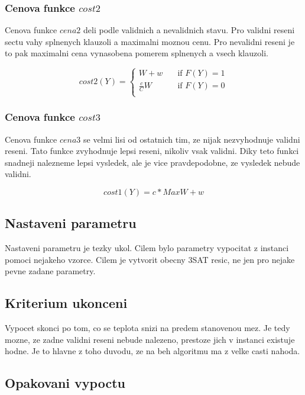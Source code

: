 \documentclass[12pt,a4paper]{article}
\begin{document}
\subsubsection{Cenova funkce $cost2$}

Cenova funkce $cena2$ deli podle validnich a nevalidnich stavu. Pro validni reseni sectu vahy splnenych klauzoli a maximalni moznou cenu. Pro nevalidni reseni je to pak maximalni cena vynasobena pomerem splnenych a vsech klauzoli.

$$
 cost2(Y) =
  \begin{cases}
    W + w       & \quad \text{if } F(Y) = 1 \\
    \frac{c}{C}W  & \quad \text{if } F(Y) = 0 \\
  \end{cases}
$$

\subsubsection{Cenova funkce $cost3$}

Cenova funkce $cena3$ se velmi lisi od ostatnich tim, ze nijak nezvyhodnuje validni reseni.  Tato funkce zvyhodnuje lepsi reseni, nikoliv vsak validni. Diky teto funkci snadneji nalezneme lepsi vysledek, ale je vice pravdepodobne, ze vysledek nebude validni.

$$ cost1(Y) = c * MaxW + w $$


\subsection{Nastaveni parametru}
Nastaveni parametru je tezky ukol. Cilem bylo parametry vypocitat z instanci pomoci nejakeho vzorce. Cilem je vytvorit obecny 3SAT resic, ne jen pro nejake pevne zadane parametry.

\subsection{Kriterium ukonceni}

Vypocet skonci po tom, co se teplota snizi na predem stanovenou mez. Je tedy mozne, ze zadne validni reseni nebude nalezeno, prestoze jich v instanci existuje hodne. Je to hlavne z toho duvodu, ze na beh algoritmu ma z velke casti nahoda.


\subsection{Opakovani vypoctu}
\end{document}
